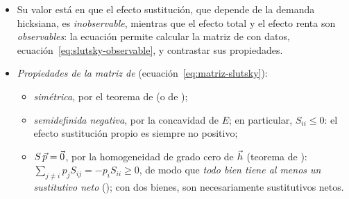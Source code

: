 \documentclass[11pt]{article}
\begin{document}
\begin{itemize}
\begin{itemize}
  \item El \emph{efecto sustitución} mide la variación de la demanda cuando cambia un precio y se mantiene la utilidad (compensación de ); el \emph{efecto renta}, la debida al cambio del poder adquisitivo que provoca el precio.
  \item \emph{En elasticidades}, multiplicando por $p_j/x_i$ y multiplicando y dividiendo el último término por $\overline{W}$,\footnote{Paso a paso, multiplicando los dos lados de~\eqref{eq:slutsky} por $p_j/x_i$:
    \[
    \underbrace{\frac{p_j}{x_i}\frac{\partial x_i(\vect{p},\overline{W})}{\partial p_j}}_{\varepsilon_{x_i,p_j}}=\underbrace{\frac{p_j}{x_i}\frac{\partial h_i(\vect{p},\overline{U})}{\partial p_j}}_{\varepsilon^{h}_{i,p_j}}-\underbrace{\frac{p_jx_j}{\overline{W}}}_{s_j}\cdot\underbrace{\frac{\overline{W}}{x_i}\frac{\partial x_i(\vect{p},\overline{W})}{\partial\overline{W}}}_{\varepsilon_{x_i,\overline{W}}},
    \]
    donde en el efecto renta se ha multiplicado y dividido por $\overline{W}$ y, en el óptimo, $h_i(\vect{p},\overline{U})=x_i(\vect{p},\overline{W})$, de modo que la elasticidad compensada puede calcularse con la misma $x_i$.\findemo}
    \begin{equation}
    \underbrace{\varepsilon_{x_i,p_j}}_{\text{ET}}=\underbrace{\varepsilon^{h}_{i,p_j}}_{\text{ES}}\ \underbrace{-\,s_j\,\varepsilon_{x_i,\overline{W}}}_{\text{ER}}. \label{eq:slutsky-elasticidades}
    \end{equation}
    El efecto renta pesa más cuanto mayor es la participación $s_j$ del bien cuyo precio cambia.
  \item La compensación puede definirse de dos formas: la de  mantiene la utilidad; la de , el poder adquisitivo (que siga siendo asequible la cesta inicial). Para variaciones infinitesimales coinciden.
  \end{itemize}
\item Su valor está en que el efecto sustitución, que depende de la demanda hicksiana, es \emph{inobservable}, mientras que el efecto total y el efecto renta son \emph{observables}: la ecuación permite calcular la matriz de  con datos, ecuación~\eqref{eq:slutsky-observable}, y contrastar sus propiedades.
\item \emph{Propiedades de la matriz de } (ecuación~\eqref{eq:matriz-slutsky}):
  \begin{itemize}
  \item \emph{simétrica}, por el teorema de  (o de );
  \item \emph{semidefinida negativa}, por la concavidad de $E$; en particular, $S_{ii}\leq 0$: el efecto sustitución propio es siempre no positivo;
  \item $S\,\vec{p}=\vec{0}$, por la homogeneidad de grado cero de $\vec{h}$ (teorema de ): $\sum_{j\neq i}p_jS_{ij}=-p_iS_{ii}\geq 0$, de modo que \emph{todo bien tiene al menos un sustitutivo neto} (); con dos bienes, son necesariamente sustitutivos netos.
  \end{itemize}
\end{itemize}
\end{document}
